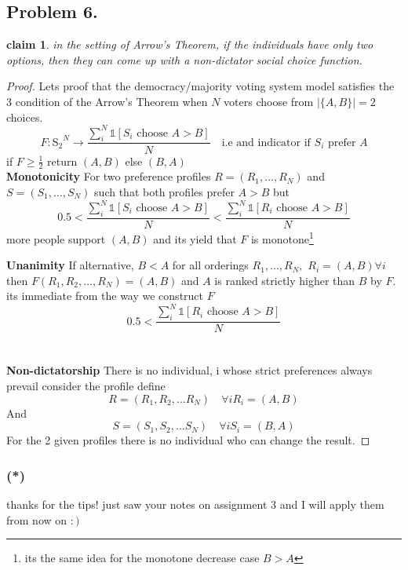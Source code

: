 \documentclass[12pt]{article}
\newtheorem*{claim*}{claim}
\begin{document}
\subsection*{Problem 6.}
\begin{claim*}
in the setting of Arrow’s Theorem, if the individuals have only two options,
then they can come up with a non-dictator social choice function.
\end{claim*}
\begin{proof}
Lets proof that the democracy/majority voting system model satisfies the 3 condition of the Arrow’s Theorem when $N$ voters choose from $|\{A,B\}|=2$ choices.
\[F:\mathrm {S_2} ^{N}\to \frac{\sum^{N}_i \mathds{1}[S_i \text{ choose } A>B] }{N} \quad \text{i.e  and indicator if $S_i$ prefer }A \]
if $F\geq \frac{1}{2}$  return $(A,B)$ else $(B,A)$\\
\textbf{Monotonicity} 
For two preference profiles $R=(R_1, …, R_N)$ and $S=(S_1, …, S_N)$ such that both profiles prefer $A>B$ but
\[
0.5<
\frac{\sum^{N}_i \mathds{1}[S_i \text{ choose } A>B] }{N}<\frac{\sum^{N}_i \mathds{1}[R_i \text{ choose } A>B] }{N}
\]
more people support $(A,B)$ and its yield that $F$ is monotone\footnote{its the same idea for the monotone decrease case $B>A$ }\pagebreak

\textbf{Unanimity}
If alternative, $B<A$ for all orderings $R_1 , …, R_N,$ $R_i=(A,B)\forall i$ then $F(R_1, R_2, …, R_N)=(A,B) $ and $A$ is ranked strictly higher than $B$ by $F$. its immediate  from the way we construct $F$
\[0.5<\frac{\sum^{N}_i \mathds{1}[R_i \text{ choose } A>B] }{N}\]\\\\
\textbf{Non-dictatorship} There is no individual, i whose strict preferences always prevail consider the profile define
\[R=(R_1,R_2,\dots R_N)\quad \forall i R_i=(A,B)
\] 
And
\[S=(S_1,S_2,\dots S_N)\quad \forall i S_i=(B,A)
\]
For the 2 given profiles there is no individual who can change the result.
\end{proof} 
\subsubsection*{(*)}thanks for the tips!  just saw your notes on assignment 3 and I will apply them from now on $:)$
\end{document}
